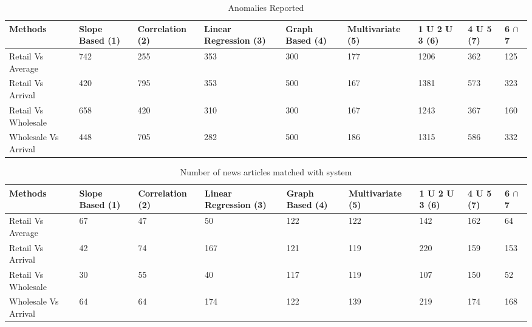   
	\begin{table}[]
	\centering
	
	\resizebox{\textwidth}{!}
	{\begin{tabular}{|l|l|l|l|l|l|l|l|l|}
	\hline
	Methods              & Slope Based (1) & Correlation (2) & Linear Regression (3) & Graph Based (4) & Multivariate (5) & 1 U 2 U 3 (6) & 4 U 5 (7) & 6 $\cap$ 7  \\
	\hline
	Retail Vs Average    & 742 & 255 & 353 & 300 & 177 & 1206 & 362 & 125 \\
	\hline
	Retail Vs Arrival    & 420 & 795 & 353 & 500 & 167 & 1381 & 573 & 323 \\
	\hline
	Retail Vs Wholesale  & 658 & 420 & 310 & 300 & 167 & 1243 & 367 & 160 \\
	\hline
	Wholesale Vs Arrival & 448 & 705 & 282 & 500 & 186 & 1315 & 586 & 332 \\
	\hline
	\end{tabular}}
	\caption{Anomalies Reported}
	\label{AnomaliesReported}
	\end{table}
      
	\begin{table}[]
	\centering
	
	\resizebox{\textwidth}{!}
	{\begin{tabular}{|l|l|l|l|l|l|l|l|l|}
	\hline
	Methods              & Slope Based (1) & Correlation (2) & Linear Regression (3) & Graph Based (4) & Multivariate (5) & 1 U 2 U 3 (6) & 4 U 5 (7) & 6 $\cap$ 7   \\
	\hline
	Retail Vs Average    & 67 & 47 & 50  & 122 & 122 & 142 & 162 & 64  \\
	\hline
	Retail Vs Arrival    & 42 & 74 & 167 & 121 & 119 & 220 & 159 & 153 \\
	\hline
	Retail Vs Wholesale  & 30 & 55 & 40  & 117 & 119 & 107 & 150 & 52  \\
	\hline
	Wholesale Vs Arrival & 64 & 64 & 174 & 122 & 139 & 219 & 174 & 168 \\
	\hline
	\end{tabular}}
	\caption{Number of news articles matched with system}
	\label{ArticlesMatched}
	\end{table}
	
      

